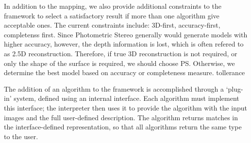In addition to the mapping, we also provide additional constraints to the framework to select a satisfactory result if more than one algorithm give acceptable ones. The current constraints include: 3D-first, accuracy-first, completenss first. Since Photometric Stereo generally would generate models with higher accuracy, however, the depth information is lost, which is often refered to as 2.5D reconstruction. Therefore, if true 3D reconstruction is not required, or only the shape of the surface is required, we should choose PS. Otherwise, we determine the best model based on accuracy or completeness measure. tollerance

The addition of an algorithm to the framework is accomplished through a `plug-in' system, defined using an internal interface. Each algorithm must implement this interface; the interpreter then uses it to provide the algorithm with the input images and the full user-defined description. The algorithm returns matches in the interface-defined representation, so that all algorithms return the same type to the user.


